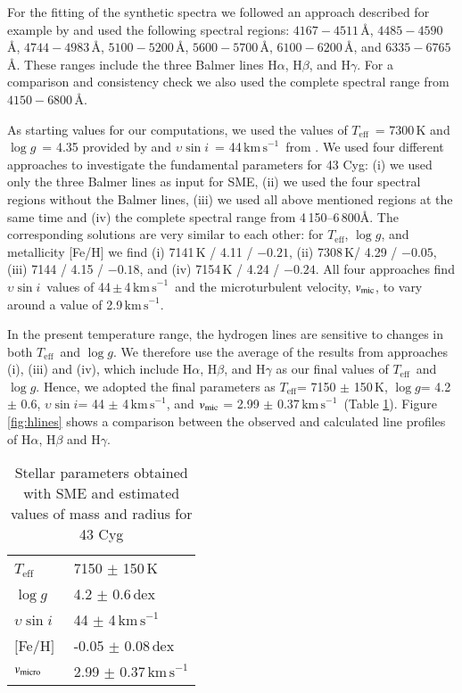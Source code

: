 \documentclass{aa}
\def\Teff{\ensuremath{T_{\mathrm{eff}}}}
\def\logg{\ensuremath{\log g}}
\def\vsini{\ensuremath{{\upsilon}\sin i}}
\def\kms{$\mathrm{km\,s}^{-1}$}
\begin{document}
For the fitting of the synthetic spectra we followed an approach described for example by \citet{ryabchikova2016} and used the following spectral regions: $4167 - 4511$\,\AA, $4485 - 4590$\,\AA, $4744 - 4983$\,\AA, $5100 - 5200$\,\AA,  $5600 - 5700$\,\AA,  $6100 - 6200$\,\AA, and $6335- 6765$\,\AA. These ranges include the three Balmer lines H$\alpha$, H$\beta$, and H$\gamma$.
For a comparison and consistency check we also used the complete spectral range from $4150 - 6800$\,\AA.

As starting values for our computations, we used the values of \Teff\ = 7300\,K and \logg\ = 4.35 provided by \citet{david2015} and \vsini\ = 44\,\kms\ from \citet{fekel2003}. We used four different approaches to investigate the fundamental parameters for 43 Cyg: (i) we used only the three Balmer lines as input for SME, (ii) we used the four spectral regions without the Balmer lines, (iii) we used all above mentioned regions at the same time and (iv) the complete spectral range from 4\,150--6\,800\AA.
The corresponding solutions are very similar to each other: for \Teff, \logg, and metallicity [Fe/H] we find (i) 7141\,K / 4.11 / $-0.21$, (ii) 7308\,K/ 4.29 / $-0.05$, (iii) 7144 / 4.15 / $-0.18$, and (iv) 7154\,K / 4.24 / $-0.24$. 
All four approaches find \vsini\ values of 44\,$\pm$\,4\,\kms\ and the microturbulent velocity, $v_{\rm mic}$, to vary around a value of 2.9\,\kms. 

In the present temperature range, the hydrogen lines are sensitive to changes in both \Teff\ and \logg. We therefore use the average of the results from approaches (i), (iii) and (iv), which include H$\alpha$, H$\beta$, and H$\gamma$ as our final values of \Teff\ and \logg.  
Hence, we adopted the final parameters as \Teff = 7150 $\pm$ 150\,K, \logg = 4.2 $\pm$ 0.6, \vsini = 44 $\pm$ 4\,\kms, and $v_{\rm mic}$ = 2.99 $\pm$ 0.37\,\kms\ (Table \ref{tab:fundpars}). Figure \ref{fig:hlines} shows a comparison between the observed and calculated line profiles of H$\alpha$, H$\beta$ and H$\gamma$. 



\begin{table}
\caption{Stellar parameters obtained with SME and estimated values of mass and radius for 43 Cyg}
\label{tab:fundpars}
\begin{center}
\begin{tabular}{ll}
\hline
\hline
\Teff\ & 7150 $\pm$ 150\,K \\
\logg\ & 4.2 $\pm$ 0.6\,dex   \\
\vsini\  &   44 $\pm$ 4\,\kms \\
$[$Fe/H$]$  & -0.05 $\pm$ 0.08\,dex  \\
$v_{\rm micro}$  &  2.99 $\pm$ 0.37\,\kms  \\
\hline
\end{tabular}
\end{center}
\end{table}
\end{document}
